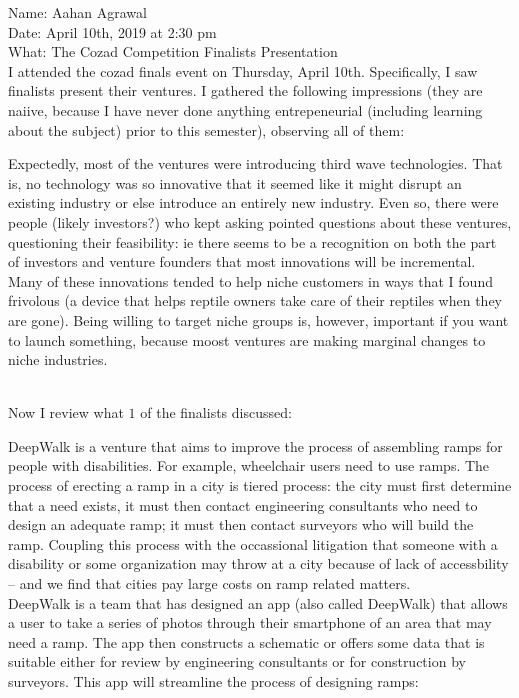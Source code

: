 \documentclass[a4paper]{article}
\begin{document}
Name: Aahan Agrawal \\

Date: April 10th, 2019 at 2:30 pm \\

What: The Cozad Competition Finalists Presentation \\

I attended the cozad finals event on Thursday, April 10th. Specifically, I saw finalists present their ventures. I gathered the following impressions (they are naiive, because I have never done anything entrepeneurial (including learning about the subject) prior to this semester), observing all of them:

\begin{outline}
    \1 Expectedly, most of the ventures were introducing third wave technologies. That is, no technology was so innovative that it seemed like it might disrupt an existing industry or else introduce an entirely new industry. Even so, there were people (likely investors?) who kept asking pointed questions about these ventures, questioning their feasibility: ie there seems to be a recognition on both the part of investors and venture founders that most innovations will be incremental.
    \1 Many of these innovations tended to help niche customers in ways that I found frivolous (a device that helps reptile owners take care of their reptiles when they are gone). Being willing to target niche groups is, however, important if you want to launch something, because moost ventures are making marginal changes to niche industries.
\end{outline}

\breathe \\
Now I review what $1$ of the finalists discussed:

DeepWalk is a venture that aims to improve the process of assembling ramps for people with disabilities. For example, wheelchair users need to use ramps. The process of erecting a ramp in a city is tiered process: the city must first determine that a need exists, it must then contact engineering consultants who need to design an adequate ramp; it must then contact surveyors who will build the ramp. Coupling this process with the occassional litigation that someone with a disability or some organization may throw at a city because of lack of accessbility -- and we find that cities pay large costs on ramp related matters. \\

DeepWalk is a team that has designed an app (also called DeepWalk) that allows a user to take a series of photos through their smartphone of an area that may need a ramp. The app then constructs a schematic or offers some data that is suitable either for review by engineering consultants or for construction by surveyors. This app will streamline the process of designing ramps: \\
\end{document}
